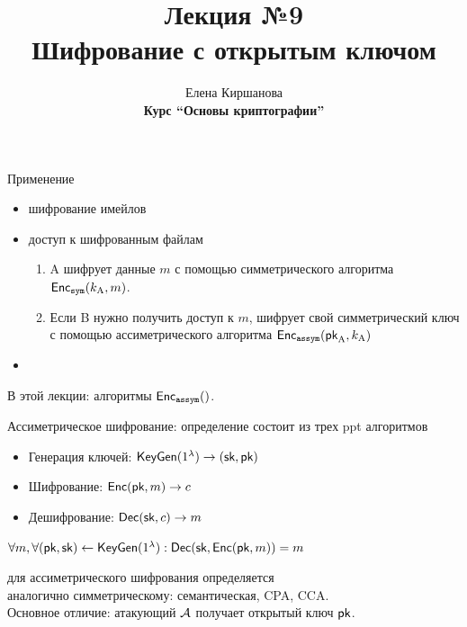 \documentclass[usenames,dvipsnames,8pt,aspectratio=169]{beamer}
\title{Лекция №9 \\[10pt]
	Шифрование с открытым ключом}
\date{ Елена Киршанова \\  \textbf{Курс ``Основы криптографии''} \\  }
\begin{document}
	
\begin{frame}
	\titlepage
\end{frame}

\begin{frame}{Применение}
	\Large 

	\begin{itemize}
		\itemsep 10pt
		\item шифрование имейлов 
		\item доступ к шифрованным файлам\\[5pt]
		\begin{enumerate}
			\itemsep 5pt
			\Large
			\item {\color{Orange} A} шифрует данные $m$ с помощью {\color{Orange} симметрического } алгоритма $\textsf{Enc}_{\mathtt{sym}}(k_{\text{A}}, m)$. 
			\item Если {\color{Orange} B} нужно получить доступ к $m$, шифрует свой симметрический ключ с помощью ассиметрического алгоритма  $\textsf{Enc}_{\mathtt{assym}}(\textsf{pk}_{\text{A}}, k_{\text{A}})$
		\end{enumerate}
		
		\item 
	\end{itemize}

\vspace{15pt}

В этой лекции: алгоритмы $\textsf{Enc}_{\mathtt{assym}}()$.

\end{frame}

\begin{frame}{Ассиметрическое шифрование: определение}
\Large
{\color{Orange}{Ассиметрическое шифрование}} состоит из трех ppt алгоритмов
\begin{itemize}
	\itemsep 10pt
	\item Генерация ключей: $\textsf{KeyGen}(1^\lambda) \rightarrow (\textsf{sk}, \textsf{pk}) $
	\item Шифрование: $\textsf{Enc}(\textsf{pk}, m ) \rightarrow c$
	\item Дешифрование:  $\textsf{Dec}(\textsf{sk}, c) \rightarrow m$
\end{itemize}

\vspace{15pt}
{\color{Orange}{Корректность:}} $\forall m, \forall (\textsf{pk}, \textsf{sk}) \leftarrow \textsf{KeyGen}(1^\lambda) : \textsf{Dec}(\textsf{sk}, \textsf{Enc}(\textsf{pk}, m)) = m$

\vspace{15pt}

{\color{Orange}{Безопасность}} для ассиметрического шифрования определяется \\ аналогично симметрическому: семантическая, CPA, CCA. \\[5pt]

Основное отличие: атакующий $\mathcal{A}$ получает открытый ключ $\textsf{pk}$.

\end{frame}
\end{document}
